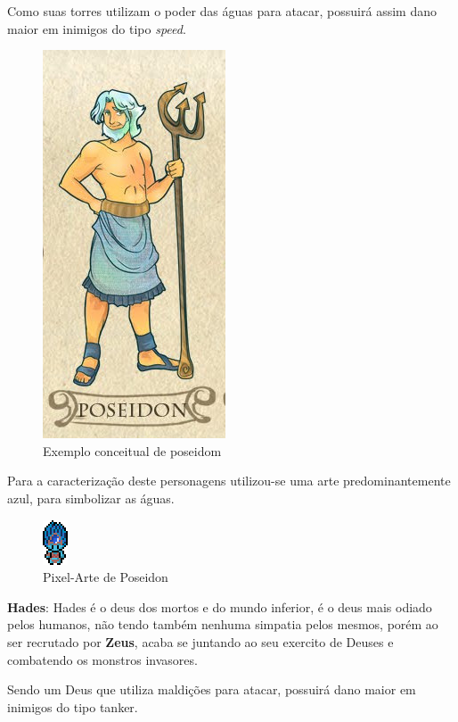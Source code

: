 \documentclass[11pt]{article} %
\begin{document}
Como suas torres utilizam o poder das águas para atacar, possuirá assim dano maior em  inimigos do tipo \textit{speed}.

\begin{figure}[!htp]
\centering
\includegraphics[scale=0.25]{res/characters/poseidom.png}
\caption{Exemplo conceitual de poseidom}
\label{poseidom}
\end{figure}

Para a caracterização deste personagens utilizou-se uma arte predominantemente azul, para simbolizar as águas.

\begin{figure}[!htp]
\centering
\includegraphics[scale=2]{res/characters/poseidon_panel.png}
\caption{Pixel-Arte de Poseidon}
\label{zeus}
\end{figure}

\newpage

{\large \textbf{Hades}}: Hades é o deus dos mortos e do mundo inferior, é o deus mais odiado pelos humanos, não tendo também nenhuma simpatia pelos mesmos, porém ao ser recrutado por \textbf{Zeus}, acaba se juntando ao seu exercito de Deuses e combatendo os monstros invasores.

Sendo um Deus que utiliza maldições para atacar, possuirá dano maior em inimigos do tipo tanker.
\end{document}
